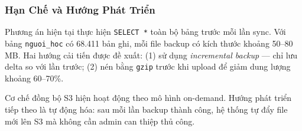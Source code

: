 \subsubsection{Hạn Chế và Hướng Phát Triển}

Phương án hiện tại thực hiện \texttt{SELECT *} toàn bộ bảng trước mỗi lần
sync. Với bảng \texttt{nguoi\_hoc} có 68.411 bản ghi, mỗi file backup có
kích thước khoảng 50--80 MB. Hai hướng cải tiến được đề xuất: (1) sử dụng
\textit{incremental backup} — chỉ lưu delta so với lần trước; (2) nén bằng
\texttt{gzip} trước khi upload để giảm dung lượng khoảng 60--70\%.

Cơ chế đồng bộ S3 hiện hoạt động theo mô hình on-demand. Hướng phát triển
tiếp theo là tự động hóa: sau mỗi lần backup thành công, hệ thống tự đẩy
file mới lên S3 mà không cần admin can thiệp thủ công.
